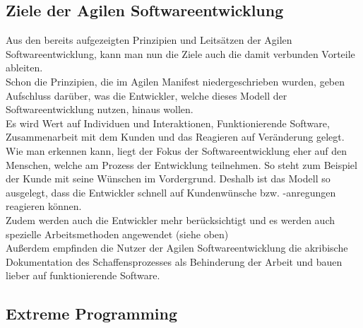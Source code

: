 \documentclass[a4paper, 10pt]{scrartcl}
\begin{document}
\subsection{Ziele der Agilen Softwareentwicklung}
Aus den bereits aufgezeigten Prinzipien und Leitsätzen der Agilen Softwareentwicklung, kann man nun die Ziele  auch die damit verbunden Vorteile ableiten. \\
Schon die Prinzipien, die im \glqq{}Agilen Manifest\grqq{} niedergeschrieben wurden, geben Aufschluss darüber, was die Entwickler, welche dieses Modell der Softwareentwicklung nutzen, hinaus wollen.\\ Es wird Wert auf \glqq{}Individuen und Interaktionen, Funktionierende Software, Zusammenarbeit mit dem Kunden und das Reagieren auf Veränderung\grqq{} gelegt. Wie man erkennen kann, liegt der Fokus der Softwareentwicklung eher auf den Menschen, welche am Prozess der Entwicklung teilnehmen. So steht zum Beispiel der Kunde mit seine Wünschen im Vordergrund. Deshalb ist das Modell so ausgelegt, dass die Entwickler schnell auf Kundenwünsche bzw. -anregungen reagieren können.\\ Zudem werden auch die Entwickler mehr berücksichtigt und es werden auch spezielle Arbeitsmethoden angewendet (siehe oben)\\Außerdem empfinden die Nutzer der Agilen Softwareentwicklung die akribische Dokumentation des Schaffensprozesses als Behinderung der Arbeit und bauen lieber auf \glqq funktionierende Software\grqq. \\ 

\subsection{Extreme Programming}
\end{document}
